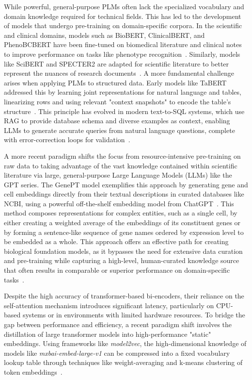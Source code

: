 \documentclass[journal]{./IEEE/IEEEtran}
\begin{document}
While powerful, general-purpose PLMs often lack the specialized vocabulary and domain knowledge required for technical fields. This has led to the development of models that undergo pre-training on domain-specific corpora. In the scientific and clinical domains, models such as BioBERT, ClinicalBERT, and PhenoBCBERT have been fine-tuned on biomedical literature and clinical notes to improve performance on tasks like phenotype recognition~\cite{yang_enhancing_2024}. Similarly, models like SciBERT and SPECTER2 are adapted for scientific literature to better represent the nuances of research documents~\cite{mandikal_sparse_2024}. A more fundamental challenge arises when applying PLMs to structured data. Early models like TaBERT addressed this by learning joint representations for natural language and tables, linearizing rows and using relevant "context snapshots" to encode the table's structure~\cite{yin_tabert_2020}. This principle has evolved in modern text-to-SQL systems, which use RAG to provide database schema and diverse examples as context, enabling LLMs to generate accurate queries from natural language questions, complete with error-correction loops for validation~\cite{thorpe_dubo-sql_2024}.

A more recent paradigm shifts the focus from resource-intensive pre-training on raw data to taking advantage of the vast knowledge contained within scientific literature via large, general-purpose Large Language Models (LLMs) like the GPT series. The GenePT model exemplifies this approach by generating gene and cell embeddings directly from their textual descriptions in curated databases like NCBI, using a powerful off-the-shelf embedding model from ChatGPT~\cite{chen_genept_2023}. This method composes representations for complex entities, such as a single cell, by either creating a weighted average of the embeddings of its constituent genes or by forming a sentence-like sequence of gene names ordered by expression level to be embedded as a whole. This approach offers an effective path for creating biological foundation models, as it bypasses the need for extensive data curation and pre-training while capturing a high-level, human-curated knowledge source that often results in comparable or superior performance on domain-specific tasks~\cite{chen_genept_2023}.

Despite the high accuracy of transformer-based bi-encoders, their reliance on the self-attention mechanism introduces significant latency, particularly on CPU-based systems or in environments with limited hardware resources. To bridge the gap between performance and efficiency, a recent paradigm shift involves the distillation of large transformer models into high-performance "static" embeddings. Using frameworks like \textit{model2vec}, the high-dimensional knowledge of models like \textit{mxbai-embed-large-v1} can be compressed into a fixed vocabulary lookup table through techniques like weight-averaging and k-means clustering of token embeddings~\cite{minishlab2024model2vec}. 
\end{document}
